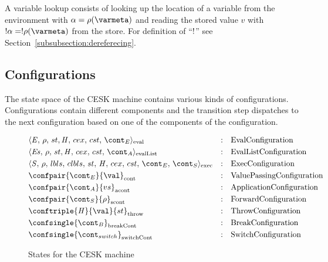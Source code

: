 \documentclass[a4paper,oneside]{article}
\begin{document}
A variable lookup consists of looking up the location of a variable from the environment with $\loc = \env(\varmeta)$ and reading the stored value $v$ with $\deref{\loc} = \deref{\env(\varmeta)}$ from the store.
For definition of ``$\deref$'' see Section~\ref{subsubsection:dereferecing}.


\subsection{Configurations}
\label{subsec:cesk-configs}

The state space of the CESK machine contains various kinds of configurations.
Configurations contain different components and the transition step dispatches to the next configuration based on one of the components of the configuration.

\newcommand{\breakconf}[1]{\confsingle{#1}_{\mathrm{breakCont}}}
\newcommand{\switchconf}[1]{\confsingle{#1}_{\mathrm{switchCont}}}
\newcommand{\contconf}[2]{\confpair{#1}{#2}_{\mathrm{cont}}}
\newcommand{\scontconf}[2]{\confpair{#1}{#2}_{\mathrm{scont}}}
\newcommand{\acontconf}[2]{\confpair{#1}{#2}_{\mathrm{acont}}}
\newcommand{\throwconf}[3]{\conftriple{#1}{#2}{#3}_{\mathrm{throw}}}
\newcommand{\evallistconf}[6]{\langle{#1},\,{#2},\,{#3},\handler,\,{#4},\,{#5},\,{#6}\rangle_{\mathrm{evalList}}}
\newcommand{\evalconf}[6]{\langle{#1},\,{#2},\,{#3},\handler,\,{#4},\,{#5},\,{#6}\rangle_{\mathrm{eval}}}
\newcommand{\execconf}[9]{\langle{#1},\,{#2},\,{#3},\,{#4},\,{#5},\,{#6},\,{#7},\,{#8},\,{#9}\rangle_{\mathrm{exec}}}

\begin{figure}[Htp]
  \begin{eqfigure}
  \begin{align}
    &\evalconf{\expr}{\env}{st}{cex}{cst}{\econt} & :\quad & \text{EvalConfiguration} \label{config:eval}\\
    &\evallistconf{\exprs}{\env}{st}{cex}{cst}{\acont} & :\quad & \text{EvalListConfiguration} \label{config:evallist}\\
    &\execconf{\stmt}{\env}{\lbls}{\clbls}{\strace}{\handler}{\cex,\,\cstrace}{\econt}{\scont}  & :\quad & \text{ExecConfiguration} \label{config:exec}\\
    &\contconf{\econt}{\val} & :\quad & \text{ValuePassingConfiguration} \label{config:econt}\\
    &\acontconf{\acont}{\vals} & :\quad & \text{ApplicationConfiguration} \label{config:acont}\\
    &\scontconf{\scont}{\env} & :\quad & \text{ForwardConfiguration} \label{config:scont}\\
    &\throwconf{\handler}{\val}{\strace} & :\quad & \text{ThrowConfiguration} \label{config:throw}\\
    &\breakconf{\bcont} & :\quad & \text{BreakConfiguration} \label{config:bcont}\\
    &\switchconf{\switchcont} & :\quad &
    \text{SwitchConfiguration}
    \label{config:switchcont}
  \end{align}
  \caption{States for the CESK machine}
  \end{eqfigure}
\end{figure}
\end{document}
